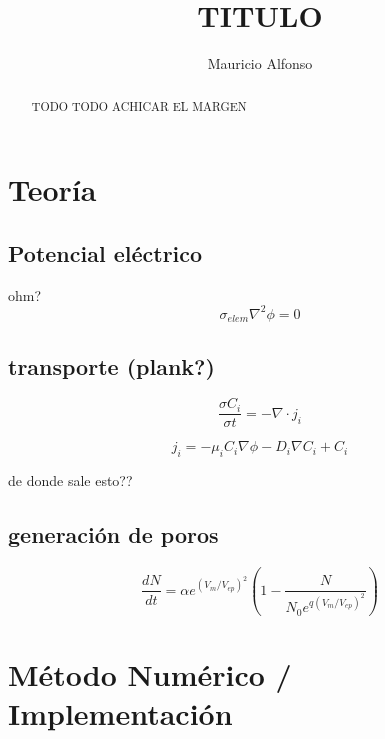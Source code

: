 \documentclass[a4paper,10pt]{article}
\title{TITULO}
\author{Mauricio Alfonso}
\begin{document}
\maketitle

\begin{abstract}
TODO
TODO ACHICAR EL MARGEN

\end{abstract}


\section{Teoría}

\subsection{Potencial eléctrico}

ohm?\\

\begin{equation} \label{eq:poisson}
	\sigma_{elem} \nabla^{2} \phi = 0 
\end{equation}

\subsection{transporte (plank?)}

\begin{equation} \label{eq:trans1}
	\frac{\sigma C_i}{\sigma t} = -\nabla \cdot j_i
\end{equation}

\begin{equation} \label{eq:trans2}
	j_i = -\mu_i C_i \nabla \phi - D_i \nabla C_i + C_i
\end{equation}

de donde sale esto??

\subsection{generación de poros}
\begin{equation}
	\frac{dN}{dt} = \alpha e^{(V_m/V_{ep})^2} \left( 1 - \frac{N}{N_0 e^{q \left(V_m/V_{ep} \right) ^2}} \right)
\end{equation}


\section{Método Numérico / Implementación}
\end{document}
